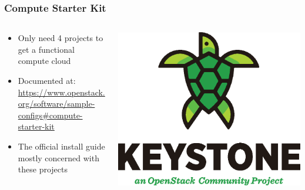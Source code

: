 \documentclass[aspectratio=169,11pt,hyperref={colorlinks=true}]{beamer}
\begin{document}
\begin{frame}
    \frametitle{Compute Starter Kit}
    \begin{columns}[T]
        \begin{column}{.48\textwidth}
            \begin{itemize}
                \item Only need 4 projects to get a functional compute cloud
                \item Documented at:\\ \small \href{https://www.openstack.org/software/sample-configs\#compute-starter-kit}{https://www.openstack.org/software/sample-configs\#compute-starter-kit}
                \item \normalsize The official install guide mostly concerned with these projects
            \end{itemize}
        \end{column}
        \begin{column}{.48\textwidth}
            \includegraphics[height=.25\textheight]{mascots/keystone.eps}

\end{column}
\end{columns}
\end{frame}
\end{document}
